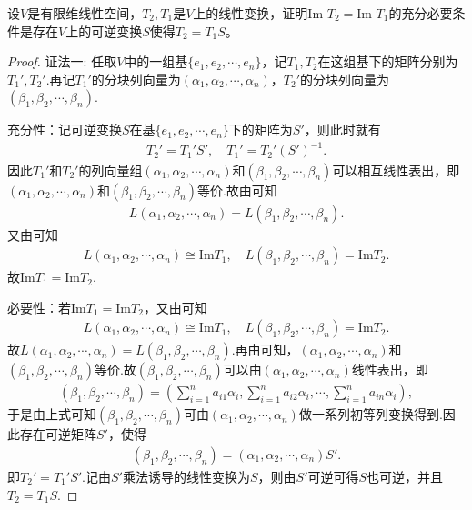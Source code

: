 \documentclass[../../main.tex]{subfiles}
\begin{document}
\begin{proposition}\label{proposition:两个线性变换的值域相等的充要条件}
设\(V\)是有限维线性空间，\(T_2,T_1\)是\(V\)上的线性变换，证明\(\text{Im }T_2 = \text{Im }T_1\)的充分必要条件是存在\(V\)上的可逆变换\(S\)使得\(T_2 = T_1S\)。 
\end{proposition}
\begin{proof}
{\color{blue}证法一:}
任取$V$中的一组基$\{ e_1,e_2,\cdots ,e_n \}$，记$T_1,T_2$在这组基下的矩阵分别为$T_{1}',T_{2}'$.再记$T_{1}'$的分块列向量为$(\alpha _1,\alpha _2,\cdots ,\alpha _n)$，$T_{2}'$的分块列向量为$(\beta _1,\beta _2,\cdots ,\beta _n)$.

充分性：记可逆变换$S$在基$\{ e_1,e_2,\cdots ,e_n \}$下的矩阵为$S'$，则此时就有
\begin{align*}
T_{2}'=T_{1}'S',\quad T_{1}'=T_{2}'(S')^{-1}.
\end{align*}
因此$T_{1}'$和$T_{2}'$的列向量组$(\alpha _1,\alpha _2,\cdots ,\alpha _n)$和$(\beta _1,\beta _2,\cdots ,\beta _n)$可以相互线性表出，即$(\alpha _1,\alpha _2,\cdots ,\alpha _n)$和$(\beta _1,\beta _2,\cdots ,\beta _n)$等价.故由可知
\begin{align*}
L(\alpha _1,\alpha _2,\cdots ,\alpha _n) =L(\beta _1,\beta _2,\cdots ,\beta _n).
\end{align*}
又由可知
\begin{align*}
L(\alpha _1,\alpha _2,\cdots ,\alpha _n) \cong \mathrm{Im}T_1,\quad L(\beta _1,\beta _2,\cdots ,\beta _n) =\mathrm{Im}T_2.
\end{align*}
故$\mathrm{Im}T_1=\mathrm{Im}T_2$.

必要性：若$\mathrm{Im}T_1=\mathrm{Im}T_2$，又由可知
\begin{align*}
L(\alpha _1,\alpha _2,\cdots ,\alpha _n) \cong \mathrm{Im}T_1,\quad L(\beta _1,\beta _2,\cdots ,\beta _n) =\mathrm{Im}T_2.
\end{align*}
故$L(\alpha _1,\alpha _2,\cdots ,\alpha _n) =L(\beta _1,\beta _2,\cdots ,\beta _n)$.再由可知，$(\alpha _1,\alpha _2,\cdots ,\alpha _n)$和$(\beta _1,\beta _2,\cdots ,\beta _n)$等价.故$(\beta _1,\beta _2,\cdots ,\beta _n)$可以由$(\alpha _1,\alpha _2,\cdots ,\alpha _n)$线性表出，即
\begin{align*}
(\beta _1,\beta _2,\cdots ,\beta _n) = \left( \sum_{i=1}^n{a_{i1}\alpha _i},\sum_{i=1}^n{a_{i2}\alpha _i},\cdots ,\sum_{i=1}^n{a_{in}\alpha _i} \right),
\end{align*}
于是由上式可知$(\beta _1,\beta _2,\cdots ,\beta _n)$可由$(\alpha _1,\alpha _2,\cdots ,\alpha _n)$做一系列初等列变换得到.因此存在可逆矩阵$S'$，使得
\begin{align*}
(\beta _1,\beta _2,\cdots ,\beta _n) = (\alpha _1,\alpha _2,\cdots ,\alpha _n)S'.
\end{align*}
即$T_{2}'=T_{1}'S'$.记由$S'$乘法诱导的线性变换为$S$，则由$S'$可逆可得$S$也可逆，并且$T_2=T_1S$.


\end{proof}
\end{document}

